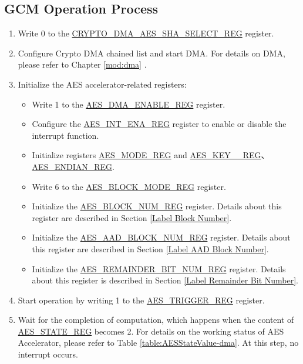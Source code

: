 \documentclass[main\_\_EN.tex]{subfiles}
\begin{document}
\subsection{ GCM Operation Process }

\begin{enumerate}
    \item Write 0 to the \hyperref[regdesc:CRYPTODMAAESSHASELECTREG]{CRYPTO\_DMA\_AES\_SHA\_SELECT\_REG} register.
    \item Configure Crypto DMA chained list and start DMA. For details on DMA, please refer to Chapter \ref{mod:dma} \textit{}.
    \item Initialize the AES accelerator-related registers:
    \begin{itemize}
        \item Write 1 to the \hyperref[regdesc:AESDMAENABLEREG]{AES\_DMA\_ENABLE\_REG} register.
        \item Configure the \hyperref[regdesc:AESINTENAREG]{AES\_INT\_ENA\_REG} register to enable or disable the interrupt function.
        \item Initialize registers \hyperref[regdesc:AESMODEREG]{AES\_MODE\_REG} and \hyperref[regdesc:AESKEYnREG]{AES\_KEY\_\_REG}、\hyperref[regdesc:AESENDIANREG]{AES\_ENDIAN\_REG}.
        \item Write 6 to the \hyperref[regdesc:AESBLOCKMODEREG]{AES\_BLOCK\_MODE\_REG} register.
        \item Initialize the \hyperref[regdesc:AESBLOCKNUMREG]{AES\_BLOCK\_NUM\_REG} register. Details about this register are described in Section \ref{Label Block Number}.
        \item Initialize the \hyperref[regdesc:AESAADBLOCKNUMREG]{AES\_AAD\_BLOCK\_NUM\_REG} register. Details about this register are described in Section \ref{Label AAD Block Number}.
        \item Initialize the \hyperref[regdesc:AESREMAINDERBITNUMREG]{AES\_REMAINDER\_BIT\_NUM\_REG} register. Details about this register is described in Section \ref{Label Remainder Bit Number}.
    \end{itemize}
    \item Start operation by writing 1 to the \hyperref[regdesc:AESTRIGGERREG]{AES\_TRIGGER\_REG} register.
    \item Wait for the completion of computation, which happens when the content of \hyperref[regdesc:AESSTATEREG]{AES\_STATE\_REG} becomes 2. For details on the working status of AES Accelerator, please refer to Table \ref{table:AESStateValue-dma}. At this step, no interrupt occurs.

\end{enumerate}
\end{document}
